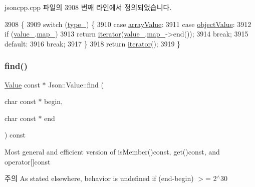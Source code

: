 jsoncpp.\+cpp 파일의 3908 번째 라인에서 정의되었습니다.


\begin{DoxyCode}
3908                          \{
3909   \textcolor{keywordflow}{switch} (\hyperlink{class_json_1_1_value_abd222c2536dc88bf330dedcd076d2356}{type\_}) \{
3910   \textcolor{keywordflow}{case} \hyperlink{namespace_json_a7d654b75c16a57007925868e38212b4eadc8f264f36b55b063c78126b335415f4}{arrayValue}:
3911   \textcolor{keywordflow}{case} \hyperlink{namespace_json_a7d654b75c16a57007925868e38212b4eae8386dcfc36d1ae897745f7b4f77a1f6}{objectValue}:
3912     \textcolor{keywordflow}{if} (\hyperlink{class_json_1_1_value_aef578244546212705b9f81eb84d7e151}{value\_}.\hyperlink{union_json_1_1_value_1_1_value_holder_a1e7a5b86d4f52234f55c847ad1ce389a}{map\_})
3913       \textcolor{keywordflow}{return} \hyperlink{class_json_1_1_value_a341cdf2e01f8b3c5b7317aa2f0768c53}{iterator}(\hyperlink{class_json_1_1_value_aef578244546212705b9f81eb84d7e151}{value\_}.\hyperlink{union_json_1_1_value_1_1_value_holder_a1e7a5b86d4f52234f55c847ad1ce389a}{map\_}->end());
3914     \textcolor{keywordflow}{break};
3915   \textcolor{keywordflow}{default}:
3916     \textcolor{keywordflow}{break};
3917   \}
3918   \textcolor{keywordflow}{return} \hyperlink{class_json_1_1_value_a341cdf2e01f8b3c5b7317aa2f0768c53}{iterator}();
3919 \}
\end{DoxyCode}
\mbox{\label{class_json_1_1_value_afb007b9ce9b2cf9d5f667a07e5e0349f}} 
\subsubsection{\texorpdfstring{find()}{find()}}
{\footnotesize\ttfamily \hyperlink{class_json_1_1_value}{Value} const  $\ast$ Json\+::\+Value\+::find (\begin{DoxyParamCaption}\item[{char const $\ast$}]{begin,  }\item[{char const $\ast$}]{end }\end{DoxyParamCaption}) const}

Most general and efficient version of is\+Member()const, get()const, and operator\mbox{[}\mbox{]}const \begin{DoxyNote}{주의}
As stated elsewhere, behavior is undefined if (end-\/begin) $>$= 2$^\wedge$30 
\end{DoxyNote}


